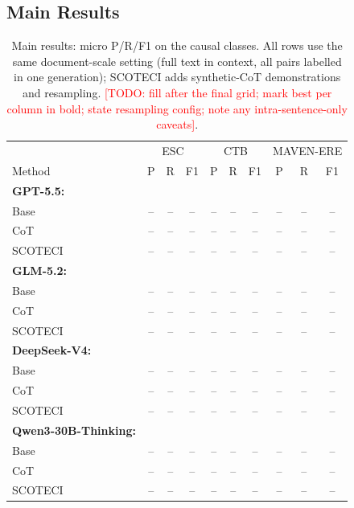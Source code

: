 \documentclass[11pt]{article}
\newcommand{\todo}[1]{\textcolor{red}{[TODO: #1]}}
\newcommand{\method}{SCOTECI}
\begin{document}
\subsection{Main Results}
\label{sec:results}

\begin{table}[htbp]
\centering
\small
\caption{Main results: micro P/R/F1 on the causal classes. All rows use the
same document-scale setting (full text in context, all pairs labelled in one
generation); \method{} adds synthetic-CoT demonstrations and resampling.
\todo{fill after the final grid; mark best per column in bold; state
resampling config; note any intra-sentence-only caveats}.}
\label{tab:main-results}
\begin{tabular}{l ccc|ccc|ccc}
\toprule
 & \multicolumn{3}{c|}{ESC} & \multicolumn{3}{c|}{CTB} & \multicolumn{3}{c}{MAVEN-ERE} \\
Method & P & R & F1 & P & R & F1 & P & R & F1 \\
\midrule
\textbf{GPT-5.5:} & & & & & & & & & \\
\quad Base          & -- & -- & -- & -- & -- & -- & -- & -- & -- \\
\quad CoT           & -- & -- & -- & -- & -- & -- & -- & -- & -- \\
\quad \method{}     & -- & -- & -- & -- & -- & -- & -- & -- & -- \\
\midrule
\textbf{GLM-5.2:} & & & & & & & & & \\
\quad Base          & -- & -- & -- & -- & -- & -- & -- & -- & -- \\
\quad CoT           & -- & -- & -- & -- & -- & -- & -- & -- & -- \\
\quad \method{}     & -- & -- & -- & -- & -- & -- & -- & -- & -- \\
\midrule
\textbf{DeepSeek-V4:} & & & & & & & & & \\
\quad Base          & -- & -- & -- & -- & -- & -- & -- & -- & -- \\
\quad CoT           & -- & -- & -- & -- & -- & -- & -- & -- & -- \\
\quad \method{}     & -- & -- & -- & -- & -- & -- & -- & -- & -- \\
\midrule
\textbf{Qwen3-30B-Thinking:} & & & & & & & & & \\
\quad Base          & -- & -- & -- & -- & -- & -- & -- & -- & -- \\
\quad CoT           & -- & -- & -- & -- & -- & -- & -- & -- & -- \\
\quad \method{}     & -- & -- & -- & -- & -- & -- & -- & -- & -- \\
\bottomrule
\end{tabular}
\end{table}
\end{document}
